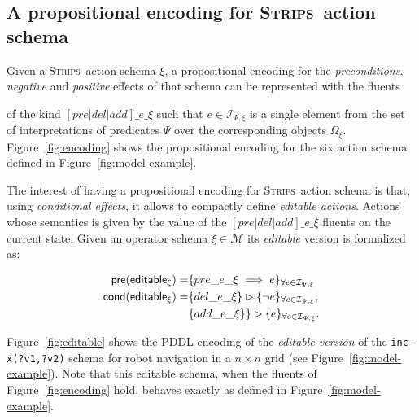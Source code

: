 \documentclass[letterpaper]{article} %
\newcommand{\pre}{\mathsf{pre}}     %
\newcommand{\cond}{\mathsf{cond}}   %
\newcommand{\strips}{\textsc{Strips}}     %
\begin{document}
\subsection{A propositional encoding for \strips\ action schema}
Given a \strips\ action schema $\xi$, a propositional encoding for the {\em preconditions}, {\em negative} and {\em positive} effects of that schema can be represented with the fluents



of the kind $[pre|del|add]\_e\_\xi$ such that $e\in{\mathcal I}_{\Psi,\xi}$ is a single element from the set of interpretations of predicates $\Psi$ over the corresponding objects $\Omega_\xi$. Figure~\ref{fig:encoding} shows the propositional encoding for the six action schema defined in Figure~\ref{fig:model-example}.

The interest of having a propositional encoding for \strips\ action schema is that, using {\em conditional effects}, it allows to compactly define {\em editable actions}. Actions whose semantics is given by the value of the $[pre|del|add]\_e\_\xi$ fluents on the current state. Given an operator schema $\xi\in\mathcal{M}$ its {\em editable} version is formalized as:
\begin{small}  
\begin{align*}
\hspace*{7pt}\pre(\mathsf{editable_{\xi}})=&\{pre\_e\_\xi\implies e\}_{\forall e\in{\mathcal I}_{\Psi,\xi}}\\
\cond(\mathsf{editable_{\xi}})=&\{del\_e\_\xi\}\rhd\{\neg e\}_{\forall e\in{\mathcal I}_{\Psi,\xi}},\\
&\{add\_e\_\xi\}\}\rhd\{e\}_{\forall e\in{\mathcal I}_{\Psi,\xi}}.
\end{align*}
\end{small}

Figure~\ref{fig:editable} shows the PDDL encoding of the {\em editable version} of the {\tt\small inc-x(?v1,?v2)} schema for robot navigation in a $n\times n$ grid (see Figure~\ref{fig:model-example}). Note that this editable schema, when the fluents of Figure~\ref{fig:encoding} hold, behaves exactly as defined in Figure~\ref{fig:model-example}. 
\end{document}
